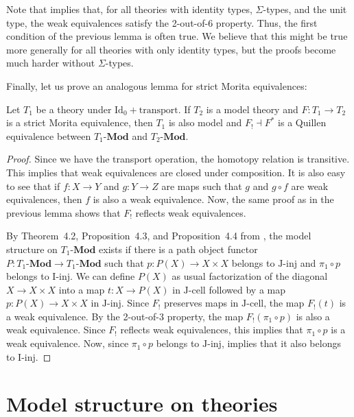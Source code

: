 \documentclass[reqno]{amsart}
\theoremstyle{definition}
\theoremstyle{remark}
\newcommand{\cat}[1]{\mathbf{#1}}
\newcommand{\Mod}[1]{#1\text{-}\cat{Mod}}
\newcommand{\IdT}{\mathrm{Id}}
\newcommand{\transportT}{\mathrm{transport}}
\newcommand{\I}{\mathrm{I}}
\newcommand{\J}{\mathrm{J}}
\newcommand{\class}[2]{#1\text{-}\mathrm{#2}}
\newcommand{\Iinj}[1][\I]{\class{#1}{inj}}
\newcommand{\Icell}[1][\I]{\class{#1}{cell}}
\newcommand{\Jinj}[1][]{\Iinj[\J#1]}
\newcommand{\Jcell}[1][]{\Icell[\J#1]}
\numberwithin{figure}{section}
\begin{document}
Note that \cite[Proposition~3.3]{kap-lum-model} implies that, for all theories with identity types, $\Sigma$-types, and the unit type, the weak equivalences satisfy the 2-out-of-6 property.
Thus, the first condition of the previous lemma is often true.
We believe that this might be true more generally for all theories with only identity types, but the proofs become much harder without $\Sigma$-types.

Finally, let us prove an analogous lemma for strict Morita equivalences:

\begin{lem}
Let $T_1$ be a theory under $\IdT_0 + \transportT$.
If $T_2$ is a model theory and $F : T_1 \to T_2$ is a strict Morita equivalence, then $T_1$ is also model and $F_! \dashv F^*$ is a Quillen equivalence between $\Mod{T_1}$ and $\Mod{T_2}$.
\end{lem}
\begin{proof}
Since we have the transport operation, the homotopy relation is transitive.
This implies that weak equivalences are closed under composition.
It is also easy to see that if $f : X \to Y$ and $g : Y \to Z$ are maps such that $g$ and $g \circ f$ are weak equivalences, then $f$ is also a weak equivalence.
Now, the same proof as in the previous lemma shows that $F_!$ reflects weak equivalences.

By Theorem~4.2, Proposition~4.3, and Proposition~4.4 from \cite{f-model-structures}, the model structure on $\Mod{T_1}$ exists if there is a path object functor $P : \Mod{T_1} \to \Mod{T_1}$
such that $p : P(X) \to X \times X$ belongs to $\Jinj$ and $\pi_1 \circ p$ belongs to $\Iinj$.
We can define $P(X)$ as usual factorization of the diagonal $X \to X \times X$ into a map $t : X \to P(X)$ in $\Jcell$ followed by a map $p : P(X) \to X \times X$ in $\Jinj$.
Since $F_!$ preserves maps in $\Jcell$, the map $F_!(t)$ is a weak equivalence.
By the 2-out-of-3 property, the map $F_!(\pi_1 \circ p)$ is also a weak equivalence.
Since $F_!$ reflects weak equivalences, this implies that $\pi_1 \circ p$ is a weak equivalence.
Now, since $\pi_1 \circ p$ belongs to $\Jinj$, \cite[Proposition~3.1]{f-model-structures} implies that it also belongs to $\Iinj$.
\end{proof}

\section{Model structure on theories}
\label{sec:model-structure}
\end{document}
